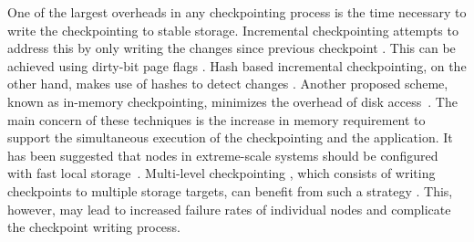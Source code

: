 One of the largest overheads in any checkpointing process is the time necessary to write the checkpointing 
to stable storage. Incremental checkpointing attempts
to address this by only writing the changes since previous checkpoint \cite{Agarwal:04:Adaptive,elnozahy_1992_manetho,li_trans_1994}. 
This can be achieved using dirty-bit page flags \cite{plank_ftcs_1994,elnozahy_1992_manetho}. Hash based incremental checkpointing, on the other hand, makes use of hashes to detect changes \cite{nam_ftc_1997,Agarwal:04:Adaptive}. 
Another proposed scheme, known as in-memory checkpointing, minimizes the overhead of disk access~\cite{zheng_2004_ftccharm,6264677}.
The main concern of these techniques is the increase in
memory requirement to support the simultaneous execution of the checkpointing and the application. 
It has been suggested that nodes in extreme-scale systems should be configured with fast local storage~\cite{doe_ascr_exascale_2011}. 
Multi-level checkpointing , which consists of
writing checkpoints to multiple storage targets, 
can benefit from such a strategy \cite{Moody:10:SCR}. This,
however, may lead to increased failure rates of individual nodes and complicate the checkpoint writing process.


